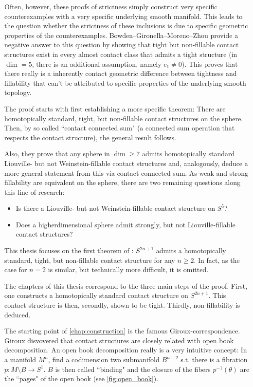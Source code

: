 Often, however, these proofs of strictness simply construct very specific counterexamples with a very specific underlying smooth manifold.
This leads to the question whether the strictness of these inclusions is due to specific geometric properties of the counterexamples.
Bowden--Gironella--Moreno--Zhou \cite{BGMZ22} provide a negative answer to this question by showing that tight but
non-fillable contact structures exist in every almost contact class that admits a tight structure (in $\dim = 5$, there is an additional assumption, namely $c_1\neq 0$).
This proves that there really is a inherently contact geometric difference between tightness and fillability
that can't be attributed to specific properties of the underlying smooth topology.

The proof starts with first establishing a more specific theorem: There are homotopically standard, tight, but non-fillable contact structures on the sphere.
Then, by so called ``contact connected sum" (a connected sum operation that respects the contact structure),
the general result follows.

Also, they prove that any sphere in $\dim \geq 7$ admits homotopically standard Liouville- but not Weinstein-fillable contact structures
and, analogously, deduce a more general statement from this via contact connected sum.
As weak and strong fillability are equivalent on the sphere, there are two remaining questions along this line of research:
\begin{itemize}
    \item Is there a Liouville- but not Weinstein-fillable contact structure on $S^5$?
    \item Does a higherdimensional sphere admit strongly, but not Liouville-fillable contact structures?
\end{itemize}

This thesis focuses on the first theorem of \cite{BGMZ22}: $S^{2n+1}$ admits a homotopically standard, tight, but non-fillable contact structure
for any $n \geq 2$. In fact, as the case for $n = 2$ is similar, but technically more difficult, it is omitted.

The chapters of this thesis correspond to the three main steps of the proof. First, one constructs a homotopically standard contact structure on $S^{2n+1}$.
This contact structure is then, secondly, shown to be tight.
Thirdly, non-fillability is deduced.

The starting point of \cref{chap:construction} is the famous Giroux-correspondence.
Giroux disvovered that contact structures are closely related with open book decomposition.
An open book decomposition really is a very intuitive concept: In a manifold $M^n$, find a codimension two submanifold $B^{n-2}$
s.t. there is a fibration $p\colon M\setminus B \to S^1$. $B$ is then called ``binding" and the closure of the fibers $p^{-1}(\theta)$ are the ``pages" of the open book 
(see \cref{fig:open_book}).

